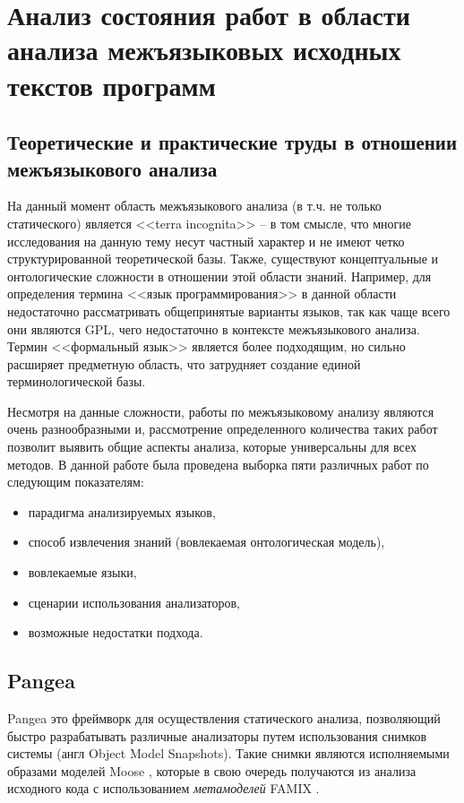 \chapter{Анализ состояния работ в области анализа межъязыковых исходных текстов программ} \label{sec:num2}

\section{Теоретические и практические труды в отношении межъязыкового анализа} \label{ssec:num2}

На данный момент область межъязыкового анализа (в т.ч. не только статического) является
<<terra incognita>> -- в том смысле, что многие исследования на данную тему несут частный характер и не
имеют четко структурированной теоретической базы. Также, существуют концептуальные и онтологические сложности
в отношении этой области знаний. Например, для определения термина <<язык программирования>> в данной области
недостаточно рассматривать общепринятые варианты языков, так как чаще всего они являются GPL,
чего недостаточно в контексте межъязыкового анализа. Термин <<формальный язык>> является более подходящим, но
сильно расширяет предметную область, что затрудняет создание единой терминологической базы.

Несмотря на данные сложности, работы по межъязыковому анализу являются очень разнообразными и, рассмотрение
определенного количества таких работ позволит выявить общие аспекты анализа, которые универсальны для всех методов.
В данной работе была проведена выборка пяти различных работ по следующим показателям:
\begin{itemize}
    \item парадигма анализируемых языков,
    \item способ извлечения знаний (вовлекаемая онтологическая модель),
    \item вовлекаемые языки,
    \item сценарии использования анализаторов,
    \item возможные недостатки подхода.
\end{itemize}

\section{Pangea} \label{ssec:pangea}

Pangea \cite{pangea} это фреймворк для осуществления статического анализа, позволяющий
быстро разрабатывать различные анализаторы путем использования снимков системы (англ Object Model Snapshots).
Такие снимки являются исполняемыми образами моделей Moose \cite{moose}, которые в свою очередь получаются из
анализа исходного кода с использованием \textit{метамоделей} FAMIX \cite{famix}.

